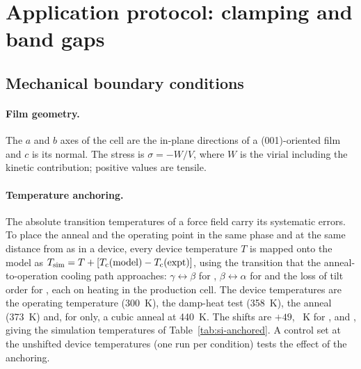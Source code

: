 \section{Application protocol: clamping and band gaps}
\label{si:app}

\subsection{Mechanical boundary conditions}
\label{si:brackets-protocol}

\paragraph{Film geometry.}
The $a$ and $b$ axes of the cell are the in-plane directions of a
(001)-oriented film and $c$ is its normal. The stress is
$\sigma = -W/V$, where $W$ is the virial including the kinetic contribution;
positive values are tensile.

\paragraph{Temperature anchoring.}
The absolute transition temperatures of a force field carry its systematic
errors. To place the anneal and the operating point in the same phase and at
the same distance from \Tc{} as in a device, every device temperature $T$ is
mapped onto the model as $T_\mathrm{sim} = T + [T_\mathrm{c}(\mathrm{model}) -
T_\mathrm{c}(\mathrm{expt})]$, using the transition that the anneal-to-operation cooling
path approaches: $\gamma\leftrightarrow\beta$ for \CsSnI{},
$\beta\leftrightarrow\alpha$ for \MASnI{} and the loss of tilt order for
\FASnI{}, each on heating in the production cell. The device temperatures are
the operating temperature (\SI{300}{K}), the damp-heat test (\SI{358}{K}), the
anneal (\SI{373}{K}) and, for \CsSnI{} only, a cubic anneal at \SI{440}{K}. The
shifts are $+49$, ~K for \CsSnI{}, \MASnI{} and \FASnI{}, giving
the simulation temperatures of Table~\ref{tab:si-anchored}. A control set at the
unshifted device temperatures (one run per condition) tests the effect of the
anchoring. 

